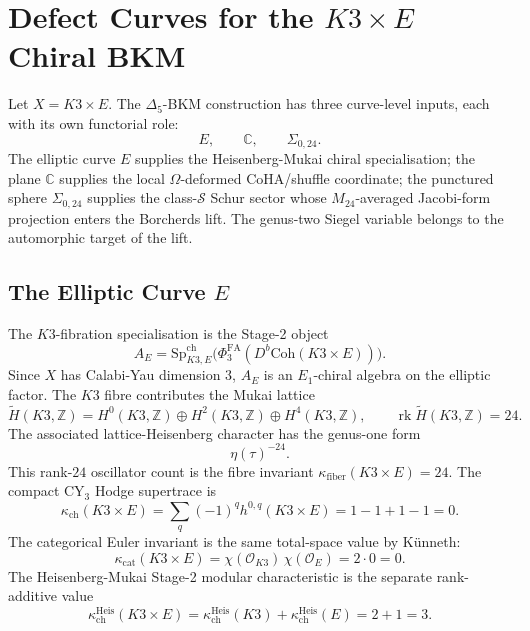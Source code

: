\providecommand{\kch}{\kappa_{\mathrm{ch}}}
\providecommand{\kcat}{\kappa_{\mathrm{cat}}}
\providecommand{\kBKM}{\kappa_{\mathrm{BKM}}}
\providecommand{\kfib}{\kappa_{\mathrm{fiber}}}
\providecommand{\PhiFA}{\Phi^{\mathrm{FA}}}
\providecommand{\SpCh}{\mathrm{Sp}^{\mathrm{ch}}}

\section*{Defect Curves for the \(K3\times E\) Chiral BKM}
\label{sec:k3e-defect-curves}

Let \(X=K3\times E\). The \(\Delta_5\)-BKM construction has three
curve-level inputs, each with its own functorial role:
\[
  E,\qquad \mathbb C,\qquad \Sigma_{0,24}.
\]
The elliptic curve \(E\) supplies the Heisenberg-Mukai chiral
specialisation; the plane \(\mathbb C\) supplies the local
\(\Omega\)-deformed CoHA/shuffle coordinate; the punctured sphere
\(\Sigma_{0,24}\) supplies the class-\(\mathcal S\) Schur sector whose
\(M_{24}\)-averaged Jacobi-form projection enters the Borcherds lift.
The genus-two Siegel variable belongs to the automorphic target of the
lift.

\subsection*{The Elliptic Curve \(E\)}

The \(K3\)-fibration specialisation is the Stage-2 object
\[
  A_E
  =
  \SpCh_{K3,E}\bigl(\PhiFA_3(D^b\mathrm{Coh}(K3\times E))\bigr).
\]
Since \(X\) has Calabi-Yau dimension \(3\), \(A_E\) is an
\(E_1\)-chiral algebra on the elliptic factor. The \(K3\) fibre
contributes the Mukai lattice
\[
  \widetilde H(K3,\mathbb Z)
  =
  H^0(K3,\mathbb Z)\oplus H^2(K3,\mathbb Z)\oplus H^4(K3,\mathbb Z),
  \qquad
  \operatorname{rk}\widetilde H(K3,\mathbb Z)=24.
\]
The associated lattice-Heisenberg character has the genus-one form
\[
  \eta(\tau)^{-24}.
\]
This rank-\(24\) oscillator count is the fibre invariant
\(\kfib(K3\times E)=24\). The compact CY\(_3\) Hodge supertrace is
\[
  \kch(K3\times E)
  =
  \sum_q(-1)^q h^{0,q}(K3\times E)
  =
  1-1+1-1
  =
  0.
\]
The categorical Euler invariant is the same total-space value by
K\"unneth:
\[
  \kcat(K3\times E)
  =
  \chi(\mathcal O_{K3})\,\chi(\mathcal O_E)
  =
  2\cdot 0
  =
  0.
\]
The Heisenberg-Mukai Stage-2 modular characteristic is the separate
rank-additive value
\[
  \kch^{\mathrm{Heis}}(K3\times E)
  =
  \kch^{\mathrm{Heis}}(K3)+\kch^{\mathrm{Heis}}(E)
  =
  2+1
  =
  3.
\]


